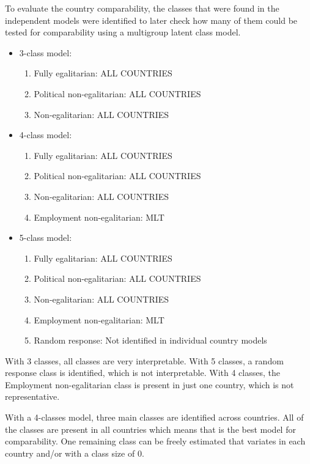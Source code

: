 \documentclass[12pt,a4paper,oneside]{reedthesis}
\providecommand{\tightlist}{%
  \setlength{\itemsep}{0pt}\setlength{\parskip}{0pt}}
\begin{document}
To evaluate the country comparability, the classes that were found in the independent models were identified to later check how many of them could be tested for comparability using a multigroup latent class model.
\begin{itemize}
\tightlist
\item
  3-class model:
  \begin{enumerate}
  \def\labelenumi{\arabic{enumi}.}
  \tightlist
  \item
    Fully egalitarian: ALL COUNTRIES
  \item
    Political non-egalitarian: ALL COUNTRIES
  \item
    Non-egalitarian: ALL COUNTRIES
  \end{enumerate}
\item
  4-class model:
  \begin{enumerate}
  \def\labelenumi{\arabic{enumi}.}
  \tightlist
  \item
    Fully egalitarian: ALL COUNTRIES
  \item
    Political non-egalitarian: ALL COUNTRIES
  \item
    Non-egalitarian: ALL COUNTRIES
  \item
    Employment non-egalitarian: MLT
  \end{enumerate}
\item
  5-class model:
  \begin{enumerate}
  \def\labelenumi{\arabic{enumi}.}
  \tightlist
  \item
    Fully egalitarian: ALL COUNTRIES
  \item
    Political non-egalitarian: ALL COUNTRIES
  \item
    Non-egalitarian: ALL COUNTRIES
  \item
    Employment non-egalitarian: MLT
  \item
    Random response: Not identified in individual country models
  \end{enumerate}
\end{itemize}
With 3 classes, all classes are very interpretable. With 5 classes, a random response class is identified, which is not interpretable. With 4 classes, the Employment non-egalitarian class is present in just one country, which is not representative.

With a 4-classes model, three main classes are identified across countries. All of the classes are present in all countries which means that is the best model for comparability. One remaining class can be freely estimated that variates in each country and/or with a class size of 0.
\end{document}
